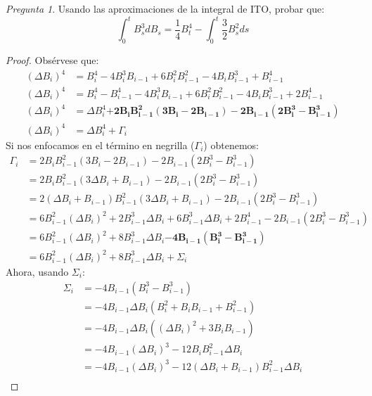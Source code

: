 \documentclass[11pt]{article}
\theoremstyle{definition}
\theoremstyle{remark}
\theoremstyle{remark}
\newtheorem{question}{Pregunta}
\begin{document}
\begin{question}
    Usando las aproximaciones de la integral de ITO, probar que:
  \begin{equation*}
    \int_0^tB_s^3dB_s = \frac{1}{4}B_t^4 - \int_0^t\frac{3}{2}B_s^2ds
  \end{equation*}
\end{question}
\begin{proof}
  Obsérvese que:
  \begin{align*}
    (\Delta B_i)^4 &= B_i^4 - 4B_i^3B_{i - 1} + 6B_i^2B_{i -1}^2 - 4B_iB_{i-1}^3 +
                      B_{i-1}^4 \\
    (\Delta B_i)^4 &= B_i^4 - B_{i -1}^4 - 4B_i^3B_{i - 1} + 6B_i^2B_{i -1}^2 - 4B_iB_{i-1}^3 +
                      2B_{i-1}^4 \\
    (\Delta B_i)^4 &= \Delta B_i^4 \pmb{+ 2B_iB_{i - 1}^2(3B_i - 2B_{i-1}) -
                      2B_{i-1}(2B_i^3 - B_{i-1}^3)} \\
    (\Delta B_i)^4 &= \Delta B_i^4 + \Gamma_i
  \end{align*}
  Si nos enfocamos en el término en negrilla ($\Gamma_i$) obtenemos:
  \begin{align*}
    \Gamma_i
    &= 2B_iB_{i - 1}^2(3B_i - 2B_{i-1}) -2B_{i-1}(2B_i^3 - B_{i-1}^3) \\
    &= 2B_iB_{i-1}^2(3\Delta B_i + B_{i-1}) -2B_{i-1}(2B_i^3 - B_{i-1}^3) \\
    &= 2(\Delta B_i + B_{i-1})B_{i-1}^2(3\Delta B_i + B_{i-1}) -2B_{i-1}(2B_i^3 - B_{i-1}^3) \\
    &= 6B_{i-1}^2(\Delta B_i)^2 + 2B_{i-1}^3\Delta B_i + 6B_{i-1}^3\Delta B_i
      + 2B_{i-1}^4 -2B_{i-1}(2B_i^3 - B_{i-1}^3) \\
    &= 6B_{i-1}^2(\Delta B_i)^2 + 8B_{i-1}^3\Delta B_i
      \pmb{-4B_{i-1}(B_i^3 - B_{i-1}^3)} \\
    &= 6B_{i-1}^2(\Delta B_i)^2 + 8B_{i-1}^3\Delta B_i + \Sigma_i
  \end{align*}
  Ahora, usando $\Sigma_i$:
  \begin{align*}
    \Sigma_i
    &= -4B_{i-1}(B_i^3 - B_{i-1}^3) \\
    &= -4B_{i-1}\Delta B_i(B_i^2 + B_iB_{i-1} + B_{i-1}^2) \\
    &= -4B_{i-1}\Delta B_i((\Delta B_i)^2 + 3B_iB_{i-1}) \\
    &= -4B_{i-1}(\Delta B_i)^3 - 12B_iB_{i-1}^2\Delta B_i \\
    &= -4B_{i-1}(\Delta B_i)^3 - 12(\Delta B_i + B_{i-1})B_{i-1}^2\Delta B_i \\

\end{align*}
\end{proof}
\end{document}
